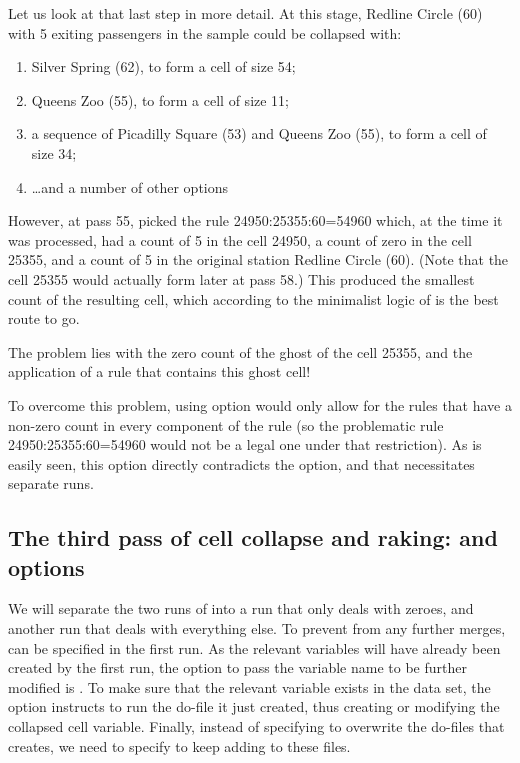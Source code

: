 Let us look at that last step in more detail. At this stage, Redline Circle (60) with 5 exiting passengers in
the sample could be collapsed with:
\begin{enumerate}
    \item Silver Spring (62), to form a cell of size 54;
    \item Queens Zoo (55), to form a cell of size 11;
    \item a sequence of Picadilly Square (53) and Queens Zoo (55), to form a cell of size 34;
    \item \ldots and a number of other options
\end{enumerate}

However, at pass 55,  picked the rule 24950:25355:60=54960 which, at the time it was
processed, had a count of 5 in the cell 24950, a count of zero in the cell 25355, and a count of 5 in the
original station Redline Circle (60). (Note that the cell 25355 would actually form later at pass 58.)
This produced the smallest count of the resulting cell, which according to the minimalist logic
of  is the best route to go.

The problem lies with the zero count of the ghost of the cell 25355, and the application of a rule
that contains this ghost cell!

To overcome this problem,  using  option would only allow for the rules
that have a non-zero count in every component of the rule (so the problematic rule
24950:25355:60=54960 would not be a legal one under that restriction). As is easily seen,
this option directly contradicts the  option, and that necessitates separate runs.

\subsection{The third pass of cell collapse and raking:  and  options}

We will separate the two runs of  into a run that only deals with zeroes,
and another run that deals with everything else. To prevent  from any further
merges,  can be specified in the first run. As the relevant variables will have already been
created by the first run, the option to pass the variable name to be further modified is
. To make sure that the relevant variable exists in the data set,
the option  instructs  to run the do-file it just created,
thus creating or modifying the collapsed cell variable.
Finally, instead of specifying  to overwrite the do-files that
 creates, we need to specify  to keep adding to these files.

